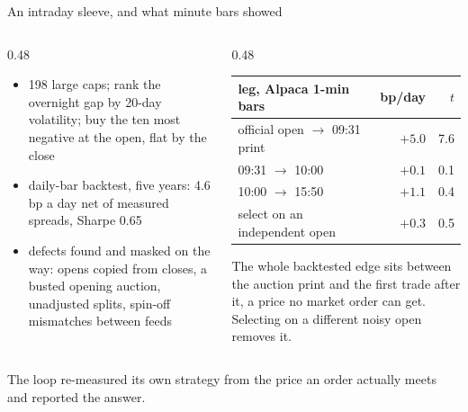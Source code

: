 \documentclass[aspectratio=169,10pt]{beamer}
\newcommand{\muted}[1]{{\color{muted}#1}}
\begin{document}
\begin{frame}{An intraday sleeve, and what minute bars showed}
  \begin{columns}[T]
    \begin{column}{0.48\textwidth}
      \begin{itemize}
        \item 198 large caps; rank the overnight gap by 20-day volatility; buy the ten most negative at the open,
              flat by the close
        \item daily-bar backtest, five years: 4.6\,bp a day net of measured spreads, Sharpe 0.65
        \item defects found and masked on the way: opens copied from closes, a busted opening auction, unadjusted
              splits, spin-off mismatches between feeds
      \end{itemize}
    \end{column}
    \begin{column}{0.48\textwidth}
      \vspace{0.2em}
      \small
      \begin{tabular}{@{}lrr@{}}
        \toprule
        leg, Alpaca 1-min bars & bp/day & $t$ \\
        \midrule
        official open $\to$ 09:31 print & $+5.0$ & 7.6 \\
        09:31 $\to$ 10:00 & $+0.1$ & 0.1 \\
        10:00 $\to$ 15:50 & $+1.1$ & 0.4 \\
        select on an independent open & $+0.3$ & 0.5 \\
        \bottomrule
      \end{tabular}
      \vspace{0.4em}

      The whole backtested edge sits between the auction print and the first trade after it, a price no market
      order can get. Selecting on a different noisy open removes it.
    \end{column}
  \end{columns}
  \vspace{0.5em}
  \muted{The loop re-measured its own strategy from the price an order actually meets and reported the answer.}
\end{frame}
\end{document}
